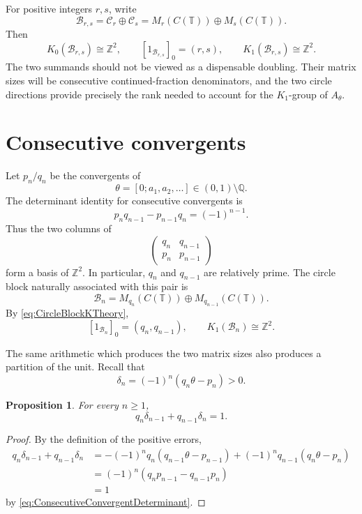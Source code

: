\documentclass{book}
\newtheorem{proposition}[definition]{Proposition}
\begin{document}
For positive integers \(r,s\), write
\[
  \mathcal B_{r,s}=\mathcal C_r\oplus\mathcal C_s
  =M_r(C(\mathbb T))\oplus M_s(C(\mathbb T)).
\]
Then
\begin{equation}\label{eq:CircleBlockKTheory}
  K_0(\mathcal B_{r,s})\cong\mathbb Z^2,
  \qquad
  [1_{\mathcal B_{r,s}}]_0=(r,s),
  \qquad
  K_1(\mathcal B_{r,s})\cong\mathbb Z^2.
\end{equation}
The two summands should not be viewed as a dispensable doubling.  Their
matrix sizes will be consecutive continued-fraction denominators, and the
two circle directions provide precisely the rank needed to account for the
\(K_1\)-group of \(A_\theta\).

\section{Consecutive convergents}

Let \(p_n/q_n\) be the convergents of
\[
  \theta=[0;a_1,a_2,\ldots]\in(0,1)\setminus\mathbb Q.
\]
The determinant identity for consecutive convergents is
\begin{equation}\label{eq:ConsecutiveConvergentDeterminant}
  p_nq_{n-1}-p_{n-1}q_n=(-1)^{n-1}.
\end{equation}
Thus the two columns of
\[
  \begin{pmatrix}
    q_n&q_{n-1}\\
    p_n&p_{n-1}
  \end{pmatrix}
\]
form a basis of \(\mathbb Z^2\).  In particular, \(q_n\) and
\(q_{n-1}\) are relatively prime.  The circle block naturally associated
with this pair is
\[
  \mathcal B_n
   =M_{q_n}(C(\mathbb T))\oplus M_{q_{n-1}}(C(\mathbb T)).
\]
By \eqref{eq:CircleBlockKTheory},
\[
  [1_{\mathcal B_n}]_0=(q_n,q_{n-1}),
  \qquad
  K_1(\mathcal B_n)\cong\mathbb Z^2.
\]

The same arithmetic which produces the two matrix sizes also produces a
partition of the unit.  Recall that
\[
  \delta_n=(-1)^n(q_n\theta-p_n)>0.
\]

\begin{proposition}\label{prop:ConvergentErrorPartition}
  For every \(n\geq1\),
  \[
    q_n\delta_{n-1}+q_{n-1}\delta_n=1.
  \]
\end{proposition}

\begin{proof}
  By the definition of the positive errors,
  \begin{align*}
    q_n\delta_{n-1}+q_{n-1}\delta_n
      &=-(-1)^nq_n(q_{n-1}\theta-p_{n-1})
        +(-1)^nq_{n-1}(q_n\theta-p_n)\\
      &=(-1)^n(q_np_{n-1}-q_{n-1}p_n)\\
      &=1
  \end{align*}
  by \eqref{eq:ConsecutiveConvergentDeterminant}.
\end{proof}
\end{document}
